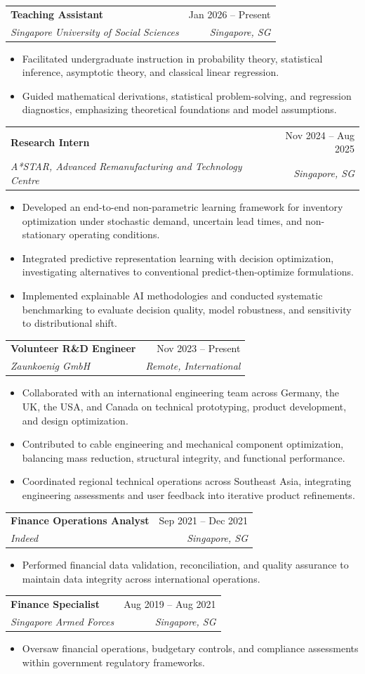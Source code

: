 \documentclass[a4paper,11pt]{article}
\makeatletter
\newcommand{\resumeItem}[1]{
  \item\small{
    {#1 \vspace{-2pt}}
  }
}
\newcommand{\resumeSubheading}[4]{
  \vspace{-2pt}\item
    \begin{tabular*}{0.97\textwidth}[t]{l@{\extracolsep{\fill}}r}
      \textbf{#1} & #2 \\
      \textit{\small#3} & \textit{\small #4} \\
    \end{tabular*}\vspace{-7pt}
}
\newcommand{\resumeItemListStart}{\begin{itemize}}
\newcommand{\resumeItemListEnd}{\end{itemize}\vspace{-5pt}}
\makeatother
\begin{document}
\resumeSubheading
{Teaching Assistant}{Jan 2026 -- Present}
{Singapore University of Social Sciences}{Singapore, SG}
\resumeItemListStart
    \resumeItem{Facilitated undergraduate instruction in probability theory, statistical inference, asymptotic theory, and classical linear regression.}
    \resumeItem{Guided mathematical derivations, statistical problem-solving, and regression diagnostics, emphasizing theoretical foundations and model assumptions.}
\resumeItemListEnd

\resumeSubheading
{Research Intern}{Nov 2024 -- Aug 2025}
{A*STAR, Advanced Remanufacturing and Technology Centre}{Singapore, SG}
\resumeItemListStart
    \resumeItem{Developed an end-to-end non-parametric learning framework for inventory optimization under stochastic demand, uncertain lead times, and non-stationary operating conditions.}
    \resumeItem{Integrated predictive representation learning with decision optimization, investigating alternatives to conventional predict-then-optimize formulations.}
    \resumeItem{Implemented explainable AI methodologies and conducted systematic benchmarking to evaluate decision quality, model robustness, and sensitivity to distributional shift.}
\resumeItemListEnd

\resumeSubheading
{Volunteer R\&D Engineer}{Nov 2023 -- Present}
{Zaunkoenig GmbH}{Remote, International}
\resumeItemListStart
    \resumeItem{Collaborated with an international engineering team across Germany, the UK, the USA, and Canada on technical prototyping, product development, and design optimization.}
    \resumeItem{Contributed to cable engineering and mechanical component optimization, balancing mass reduction, structural integrity, and functional performance.}
    \resumeItem{Coordinated regional technical operations across Southeast Asia, integrating engineering assessments and user feedback into iterative product refinements.}
\resumeItemListEnd

\resumeSubheading
{Finance Operations Analyst}{Sep 2021 -- Dec 2021}
{Indeed}{Singapore, SG}
\resumeItemListStart
    \resumeItem{Performed financial data validation, reconciliation, and quality assurance to maintain data integrity across international operations.}
\resumeItemListEnd

\resumeSubheading
{Finance Specialist}{Aug 2019 -- Aug 2021}
{Singapore Armed Forces}{Singapore, SG}
\resumeItemListStart
    \resumeItem{Oversaw financial operations, budgetary controls, and compliance assessments within government regulatory frameworks.}
\resumeItemListEnd
\end{document}
